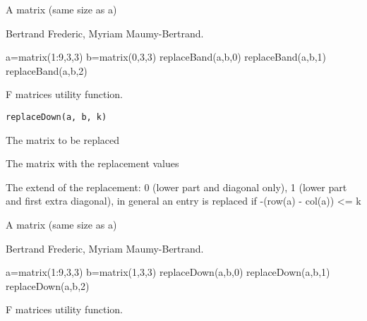 \documentclass[a4paper]{book}
\begin{document}
%
\begin{Value}
A matrix (same size as a) 
\end{Value}
%
\begin{Author}\relax
Bertrand Frederic, Myriam Maumy-Bertrand.
\end{Author}
%
\begin{Examples}
\begin{ExampleCode}
a=matrix(1:9,3,3)
b=matrix(0,3,3)
replaceBand(a,b,0)
replaceBand(a,b,1)
replaceBand(a,b,2)
\end{ExampleCode}
\end{Examples}
%
\begin{Description}\relax
F matrices utility function.
\end{Description}
%
\begin{Usage}
\begin{verbatim}
replaceDown(a, b, k)
\end{verbatim}
\end{Usage}
%
\begin{Arguments}
\begin{ldescription}
\item[\code{a}] The matrix to be replaced
\item[\code{b}] The matrix with the replacement values
\item[\code{k}] The extend of the replacement: 0 (lower part and diagonal only), 1 (lower part and first extra diagonal), in general an entry is replaced if -(row(a) - col(a)) <= k
\end{ldescription}
\end{Arguments}
%
\begin{Value}
A matrix (same size as a) 
\end{Value}
%
\begin{Author}\relax
Bertrand Frederic, Myriam Maumy-Bertrand.
\end{Author}
%
\begin{Examples}
\begin{ExampleCode}
a=matrix(1:9,3,3)
b=matrix(1,3,3)
replaceDown(a,b,0)
replaceDown(a,b,1)
replaceDown(a,b,2)
\end{ExampleCode}
\end{Examples}
%
\begin{Description}\relax
F matrices utility function.
\end{Description}
\end{document}

